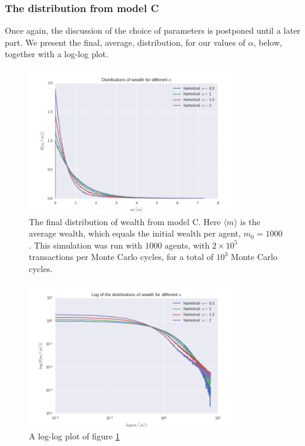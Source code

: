 \documentclass[a4paper, 10pt]{article}
\begin{document}
\subsubsection{The distribution from model C}
Once again, the discussion of the choice of parameters is postponed until a later part. We present the final, average, distribution, for our values of $\alpha$, below, together with a log-log plot.
\begin{figure}[!ht]
\centering
\includegraphics[height=2.5in]{distAlphas.png} %
\caption{The final distribution of wealth from model C. Here $\langle m \rangle$ is the average wealth, which equals the initial wealth per agent, $m_0=1000$. This simulation was run with $1000$ agents, with $2 \times 10^5$ transactions per Monte Carlo cycles, for a total of $10^3$ Monte Carlo cycles.}\label{fig:ModelC_final_distribution}
\end{figure}
\begin{figure}[!ht]
\centering
\includegraphics[height=2.5in]{logDistAlphas.png} %
\caption{A log-log plot of figure \ref{fig:ModelC_final_distribution}}\label{fig:ModelC_final_distribution_log}
\end{figure}
\end{document}
